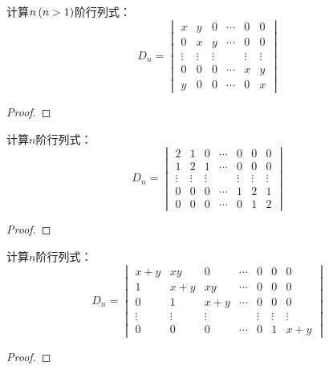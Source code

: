 \begin{problem}
计算\(n\left( n>1 \right)\)阶行列式：
\begin{equation*}
    D_n=
    \begin{vmatrix}
        x      & y      & 0      & \cdots & 0      & 0      \\
        0      & x      & y      & \cdots & 0      & 0      \\
        \vdots & \vdots & \vdots &        & \vdots & \vdots \\
        0      & 0      & 0      & \cdots & x      & y      \\
        y      & 0      & 0      & \cdots & 0      & x
    \end{vmatrix}
\end{equation*}
\end{problem}
\begin{proof}
\end{proof}

\begin{problem}
计算\(n\)阶行列式：
\begin{equation*}
    D_n=
    \begin{vmatrix}
        2      & 1      & 0      & \cdots & 0      & 0      & 0      \\
        1      & 2      & 1      & \cdots & 0      & 0      & 0      \\
        \vdots & \vdots & \vdots &        & \vdots & \vdots & \vdots \\
        0      & 0      & 0      & \cdots & 1      & 2      & 1      \\
        0      & 0      & 0      & \cdots & 0      & 1      & 2
    \end{vmatrix}
\end{equation*}
\end{problem}
\begin{proof}
\end{proof}

\begin{problem}
计算\(n\)阶行列式：
\begin{equation*}
    D_n=
    \begin{vmatrix}
        x+y    & xy     & 0      & \cdots & 0      & 0      & 0      \\
        1      & x+y    & xy     & \cdots & 0      & 0      & 0      \\
        0      & 1      & x+y    & \cdots & 0      & 0      & 0      \\
        \vdots & \vdots & \vdots &        & \vdots & \vdots & \vdots \\
        0      & 0      & 0      & \cdots & 0      & 1      & x+y
    \end{vmatrix}
\end{equation*}
\end{problem}
\begin{proof}
\end{proof}

